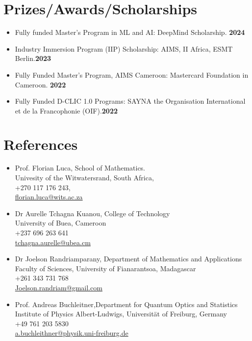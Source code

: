 \documentclass[a4paper, 9pt]{article}
\newlength{\lfonts}
\begin{document}
\section{Prizes/Awards/Scholarships}
\begin{itemize}
	\item[\faTrophy] Fully funded Master's Program in ML and AI: DeepMind Scholarship. \hfill \textbf{\color{emphasis}2024}
	\item[\faTrophy] Industry Immersion Program (IIP) Scholarship: AIMS, II Africa, ESMT Berlin.\hfill \textbf{\color{emphasis}2023}
	\item[\faTrophy] Fully Funded Master's Program, AIMS Cameroon: Mastercard Foundation in Cameroon. \hfill \textbf{\color{emphasis}2022}
	\item[\faTrophy] Fully Funded D-CLIC 1.0 Programs: SAYNA  the Organisation International et de la Francophonie (OIF).\hfill \textbf{\color{emphasis}2022}
\end{itemize}
\section{References}
\begin{itemize}
	\item Prof. Florian Luca, School of Mathematics.\\
		Univesity of the Witwatersrand, South Africa,\\
		+270 117 176 243,\\
		\href{florian.luca@wits.ac.za}{florian.luca@wits.ac.za}
	\item Dr Aurelle Tchagna Kuanou, College of Technology\\
	University of Buea, Cameroon\\
	+237 696 263 641\\
	\href{tchagna.aurelle@ubea.cm}{tchagna.aurelle@ubea.cm}
	\item Dr Joelson Randriamparany, Department of Mathematics and Applications\\
	Faculty of Sciences, University of Fianarantsoa, Madagascar\\
	+261 343 731 768\\
	\href{Joelson.randriam@gmail.com}{Joelson.randriam@gmail.com}

	\item Prof. Andreas Buchleitner,Department for Quantum Optics and Statistics\\
		Institute of Physics Albert-Ludwigs, Universität of Freiburg, Germany \\
		+49 761 203 5830\\
		\href{a.buchleithner@physik.uni-freiburg.de}{a.buchleithner@physik.uni-freiburg.de}
\end{itemize}
\end{document}
